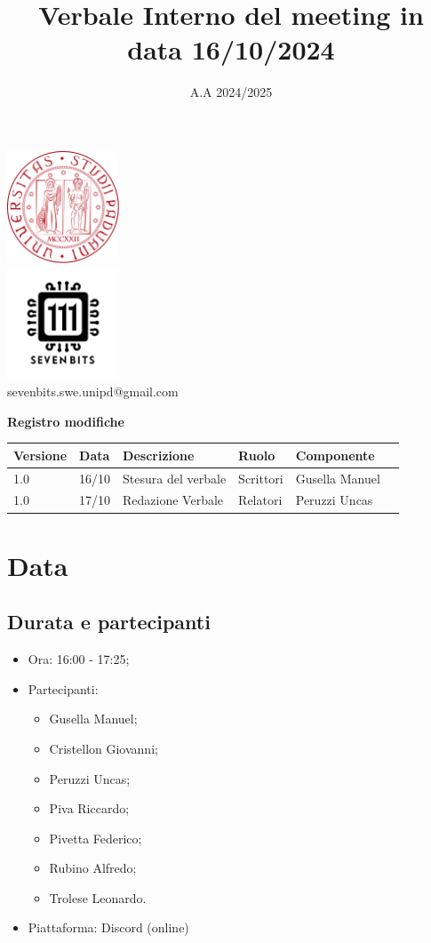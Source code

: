 \documentclass[12pt]{article}
\title{Verbale Interno del meeting in data 16/10/2024}
\date{A.A 2024/2025}
\begin{document}
\maketitle
\center 
\includegraphics[width=0.25\textwidth]{LogoUnipd}\\
\includegraphics[width=0.25\textwidth]{Sevenbitslogo}\\
sevenbits.swe.unipd@gmail.com\\
\vspace{2mm}

\textbf{Registro modifiche}\\
\vspace{2mm}
\begin{tabular}{|l|l|l|l|l|l|}
\hline
\textbf{Versione} & \textbf{Data} & \textbf{Descrizione} & \textbf{Ruolo} & \textbf{Componente} \\
\hline
1.0 & 16/10 & Stesura del verbale & Scrittori & Gusella Manuel\\
\hline
1.0 & 17/10 & Redazione Verbale & Relatori & Peruzzi Uncas \\
\hline
\end{tabular}

\raggedright
\tableofcontents
\newpage
\section{Data}
\subsection{Durata e partecipanti}
\begin{itemize}
\item Ora: 16:00 - 17:25;
\item Partecipanti: 	
	\begin{itemize}
	\item Gusella Manuel;
	\item Cristellon Giovanni;
	\item Peruzzi Uncas;
	\item Piva Riccardo;
	\item Pivetta Federico;
	\item Rubino Alfredo;
	\item Trolese Leonardo.
	\end{itemize}
\item Piattaforma: Discord (online)
\end{itemize}
\end{document}
